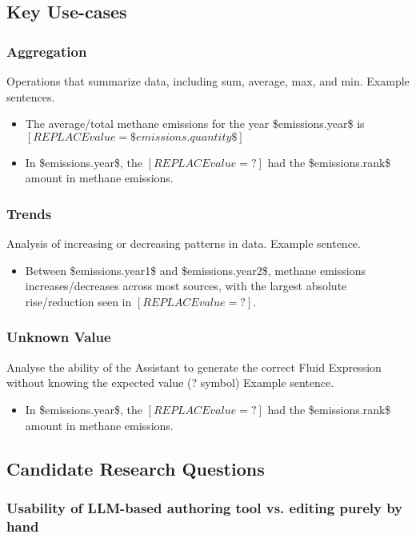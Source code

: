 \subsection{Key Use-cases}
\label{subsec:key-use-cases}

\subsubsection{Aggregation}
Operations that summarize data, including sum, average, max, and min.
Example sentences.
\begin{itemize}
    \item The average/total methane emissions for the year \$emissions.year\$ is $[REPLACE value=\$emissions.quantity\$]$
    \item In \$emissions.year\$, the $[REPLACE value=?]$ had the \$emissions.rank\$ amount in methane emissions.
\end{itemize}

\subsubsection{Trends}
Analysis of increasing or decreasing patterns in data.
Example sentence.
\begin{itemize}
    \item Between \$emissions.year1\$ and \$emissions.year2\$, methane emissions increases/decreases across most sources, with the largest absolute rise/reduction seen in  $[REPLACE value=?]$.
\end{itemize}

\subsubsection{Unknown Value}
Analyse the ability of the Assistant to generate the correct Fluid Expression without knowing the expected value (? symbol)
Example sentence.
\begin{itemize}
    \item In \$emissions.year\$, the $[REPLACE value=?]$ had the \$emissions.rank\$ amount in methane emissions.
\end{itemize}


\subsection{Candidate Research Questions}
\label{subsec:candidate-research-questions}

\subsubsection[Usability of LLM-based authoring tool vs. editing purely by hand]{Usability of LLM-based authoring tool vs. editing purely by hand}

